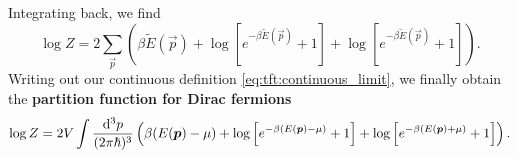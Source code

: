 Integrating back, we find
\begin{equation}
	\log Z = 2 \sum_\vec{p} \left( \beta \tilde E(\vec{p}) + \log\left[ e^{-\beta \tilde E(\vec{p})}+1 \right] + \log\left[ e^{-\beta \tilde E(\vec{p})} + 1\right] \right) .
\end{equation}
Writing out our continuous definition \eqref{eq:tft:continuous_limit}, we finally obtain the \textbf{partition function for Dirac fermions}
\begin{equation}
	\log Z = 2 V \int \frac{\mathop{}\!\mathrm{d}^3 p}{(2 \pi \hbar)^3} \left( \beta (E({\bm{p}}) - \mu) + \log\left[ e^{-\beta (E({\bm{p}}) - \mu)}+1 \right] + \log\left[ e^{-\beta (E({\bm{p}}) + \mu)} + 1\right] \right) .
\label{eq:tft:dirac_partition_function}
\end{equation}
